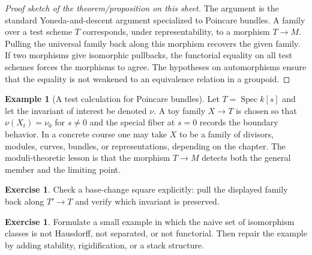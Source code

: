 \documentclass[11pt]{amsart}
\theoremstyle{definition}
\newtheorem{example}[theorem]{Example}
\newtheorem{exercise}[theorem]{Exercise}
\newcommand{\Spec}{\operatorname{Spec}}
\begin{document}
\begin{proof}[Proof sketch of the theorem/proposition on this sheet]
The argument is the standard Yoneda-and-descent argument specialized to Poincare bundles.  A family over a test scheme $T$ corresponds, under representability, to a morphism $T\to M$.  Pulling the universal family back along this morphism recovers the given family.  If two morphisms give isomorphic pullbacks, the functorial equality on all test schemes forces the morphisms to agree.  The hypotheses on automorphisms ensure that the equality is not weakened to an equivalence relation in a groupoid.
\end{proof}
\begin{example}[A test calculation for Poincare bundles]
Let $T=\Spec k[s]$ and let the invariant of interest be denoted $\nu$.  A toy family $X\to T$ is chosen so that $\nu(X_t)=\nu_0$ for $s\ne0$ and the special fiber at $s=0$ records the boundary behavior.  In a concrete course one may take $X$ to be a family of divisors, modules, curves, bundles, or representations, depending on the chapter.  The moduli-theoretic lesson is that the morphism $T\to M$ detects both the general member and the limiting point.
\end{example}
\begin{exercise}
Check a base-change square explicitly: pull the displayed family back along $T\prime\to T$ and verify which invariant is preserved.
\end{exercise}
\begin{exercise}
Formulate a small example in which the naive set of isomorphism classes is not Hausdorff, not separated, or not functorial.  Then repair the example by adding stability, rigidification, or a stack structure.
\end{exercise}
\clearpage
\end{document}
